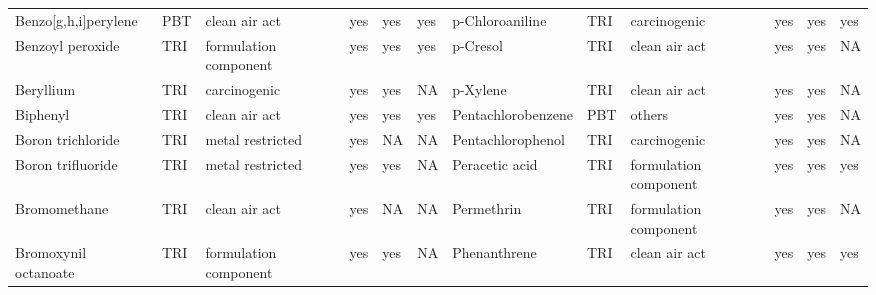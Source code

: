 \begin{table}[H]
{\begin{tabular}{llllllllllll}
            Benzo[g,h,i]perylene                                                       & PBT            & clean air act         & yes    & yes     & yes  & p-Chloroaniline                                                                                                    & TRI            & carcinogenic & yes & yes & yes\\
            Benzoyl peroxide                                                           & TRI            & formulation component & yes    & yes     & yes  & p-Cresol                                                                                                           & TRI            & clean air act & yes & yes & NA\\
            Beryllium                                                                  & TRI            & carcinogenic          & yes    & yes     & NA   & p-Xylene                                                                                                           & TRI            & clean air act         & yes    & yes     & NA   \\
            Biphenyl                                                                   & TRI            & clean air act         & yes    & yes     & yes  & Pentachlorobenzene                                                                                                 & PBT            & others                & yes    & yes     & NA   \\
            Boron trichloride                                                          & TRI            & metal restricted      & yes    & NA      & NA   & Pentachlorophenol                                                                                                  & TRI            & carcinogenic & yes & yes & NA\\
            Boron trifluoride                                                          & TRI            & metal restricted      & yes    & yes     & NA   & Peracetic acid                                                                                                     & TRI            & formulation component & yes & yes & yes\\
            Bromomethane                                                               & TRI            & clean air act         & yes    & NA      & NA   & Permethrin                                                                                                         & TRI            & formulation component & yes & yes & NA\\
            Bromoxynil octanoate                                                       & TRI            & formulation component & yes    & yes     & NA   & Phenanthrene                                                                                                       & TRI            & clean air act & yes & yes & yes\\

\end{tabular}}
\end{table}
